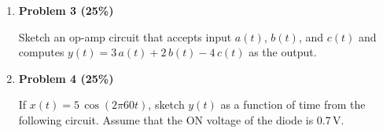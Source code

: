 \documentclass[12pt]{article}
\begin{document}
\begin{enumerate}
\item {\bf Problem 3 (25\%)}

  Sketch an op-amp circuit that accepts input $a(t)$, $b(t)$, and
  $c(t)$ and computes $y(t)=3\,a(t)+2\,b(t)-4\,c(t)$ as the output.

\item {\bf Problem 4 (25\%)}

  If $x(t)=5\,\cos(2\pi 60 t)$, sketch $y(t)$ as a function of time from
  the following circuit. Assume that the ON voltage of the diode is 0.7\,V.


\end{enumerate}
\end{document}
